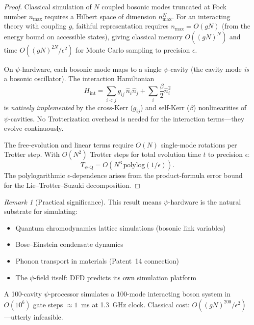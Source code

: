 \documentclass[11pt]{article}
\theoremstyle{definition}
\theoremstyle{remark}
\newtheorem{remark}[theorem]{Remark}
\begin{document}
\begin{proof}
Classical simulation of $N$ coupled bosonic modes truncated at Fock number
$n_{\max}$ requires a Hilbert space of dimension $n_{\max}^N$. For an
interacting theory with coupling $g$, faithful representation requires
$n_{\max} = O(gN)$ (from the energy bound on accessible states), giving
classical memory $O((gN)^N)$ and time $O((gN)^{2N}/\epsilon^2)$ for Monte
Carlo sampling to precision $\epsilon$.

On $\psi$-hardware, each bosonic mode maps to a single $\psi$-cavity (the
cavity mode \emph{is} a bosonic oscillator). The interaction Hamiltonian
\begin{equation}
H_{\mathrm{int}} = \sum_{i<j} g_{ij}\,\hat{n}_i\hat{n}_j
+ \sum_i \frac{\beta}{2}\hat{n}_i^2
\end{equation}
is \emph{natively implemented} by the cross-Kerr ($g_{ij}$) and self-Kerr
($\beta$) nonlinearities of $\psi$-cavities. No Trotterization overhead is
needed for the interaction terms---they evolve continuously.

The free-evolution and linear terms require $O(N)$ single-mode rotations
per Trotter step. With $O(N^2)$ Trotter steps for total evolution time
$t$ to precision $\epsilon$:
\begin{equation}
T_{\psi\text{-Q}} = O(N^3\,\mathrm{polylog}(1/\epsilon)).
\end{equation}
The polylogarithmic $\epsilon$-dependence arises from the
product-formula error bound for the Lie--Trotter--Suzuki decomposition.
\end{proof}

\begin{remark}[Practical significance]
This result means $\psi$-hardware is the natural substrate for simulating:
\begin{itemize}[nosep]
\item Quantum chromodynamics lattice simulations (bosonic link variables)
\item Bose--Einstein condensate dynamics
\item Phonon transport in materials (Patent~14 connection)
\item The $\psi$-field itself: DFD predicts its own simulation platform
\end{itemize}
A 100-cavity $\psi$-processor simulates a 100-mode interacting boson
system in $O(10^6)$ gate steps $\approx 1$~ms at 1.3~GHz clock.
Classical cost: $O((gN)^{200}/\epsilon^2)$---utterly infeasible.
\end{remark}
\end{document}
